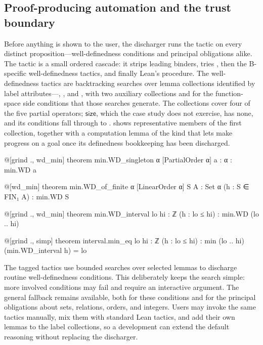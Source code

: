 \subsection{Proof-producing automation and the trust boundary}
\label{subsec:barrel-automation}

Before anything is shown to the user, the discharger runs the tactic
 on every distinct proposition---well-definedness conditions and
principal obligations alike.
The tactic is a small ordered cascade: it strips leading binders, tries ,
then the B-specific well-definedness tactics, and finally Lean's  procedure.
The well-definedness tactics are backtracking searches over lemma collections identified by
label attributes---, ,  and
, with two auxiliary collections  and  for the
function-space side conditions that those searches generate.
The collections cover four of the five partial operators; \(\mathsf{size}\), which the
case study does not exercise, has none, and its conditions fall through to
.
 shows representative members of the first collection,
together with a computation lemma of the kind that lets  make progress on a
goal once its definedness bookkeeping has been discharged.

\begin{leanlisting}[title={Representative lemmas driving \barrel{}'s automation.},
    label={lst:barrel-automation-lemmas}, float=t]
@[grind ., wd_min]
theorem min.WD_singleton {α} [PartialOrder α] {a : α} : min.WD {a}

@[wd_min]
theorem min.WD_of_finite {α} [LinearOrder α] {S A : Set α}
    (h : S ∈ FIN₁ A) : min.WD S

@[grind ., wd_min]
theorem min.WD_interval {lo hi : ℤ} (h : lo ≤ hi) :
    min.WD (lo .. hi)

@[grind ., simp]
theorem interval.min_eq {lo hi : ℤ} (h : lo ≤ hi) :
    min (lo .. hi) (min.WD_interval h) = lo
\end{leanlisting}

The tagged tactics use bounded searches over selected lemmas to discharge routine
well-definedness conditions.
This deliberately keeps the search simple: more involved conditions may fail and require
an interactive argument. The general  fallback remains available, both for
these conditions and for the principal obligations about sets, relations, orders, and
integers.
Users may invoke the same tactics manually, mix them with standard Lean tactics, and add
their own lemmas to the label collections, so a development can extend the default
reasoning without replacing the discharger.

